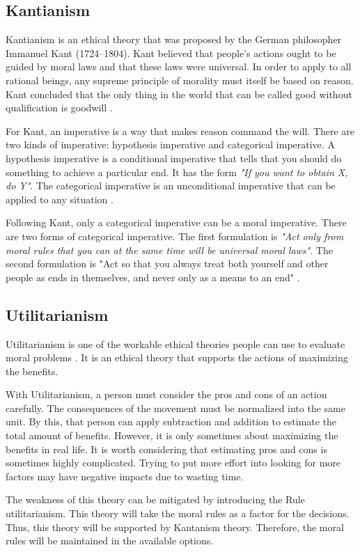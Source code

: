 \documentclass[12pt]{article}
\begin{document}
\subsection{Kantianism}
Kantianism is an ethical theory that was proposed by the German philosopher Immanuel Kant (1724–1804). Kant believed that people’s actions ought to be guided by moral laws and that these laws were universal. In order to apply to all rational beings, any supreme principle of morality must itself be based on reason. Kant concluded that the only thing in the world that can be called good without qualification is goodwill \cite{slideethic}. 

For Kant, an imperative is a way that makes reason command the will. There are two kinds of imperative: hypothesis imperative and categorical imperative. A hypothesis imperative is a conditional imperative that tells that you should do something to achieve a particular end. It has the form \textit{"If you want to obtain X, do Y"}. The categorical imperative is an unconditional imperative that can be applied to any situation \cite{quinn-2017}.

Following Kant, only a categorical imperative can be a moral imperative. There are two forms of categorical imperative. The first formulation is \textit{"Act only from moral rules that you can at the same time will be
universal moral laws"}. The second formulation is "Act so that you always treat both yourself and other people as ends in themselves, and never only as a means to an end" \cite{quinn-2017}.

\subsection{Utilitarianism}
Utilitarianism is one of the workable ethical theories people can use to evaluate moral problems \cite{quinn-2017}. It is an ethical theory that supports the actions of maximizing the benefits. 
    
With Utilitarianism, a person must consider the pros and cons of an action carefully. The consequences of the movement must be normalized into the same unit. By this, that person can apply subtraction and addition to estimate the total amount of benefits. However, it is only sometimes about maximizing the benefits in real life. It is worth considering that estimating pros and cons is sometimes highly complicated. Trying to put more effort into looking for more factors may have negative impacts due to wasting time.

The weakness of this theory can be mitigated by introducing the Rule utilitarianism. This theory will take the moral rules as a factor for the decisions. Thus, this theory will be supported by Kantanism theory. Therefore, the moral rules will be maintained in the available options.
\end{document}
